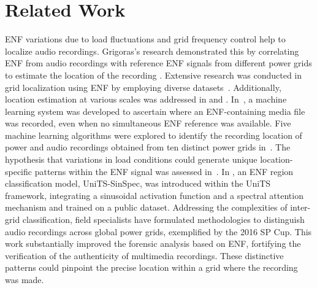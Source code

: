 \section{Related Work}
\label{sec:relatedWork}

ENF variations due to load fluctuations and grid frequency control help to localize audio recordings. Grigoras's research demonstrated this by correlating ENF from audio recordings with reference ENF signals from different power grids to estimate the location of the recording \cite{grigoras2005digital}. Extensive research was conducted in grid localization using ENF by employing diverse datasets~\cite{yao2017source}. Additionally, location estimation at various scales was addressed in \cite{sarkar2019application} and \cite{garg2021}. In~\cite{hajj2015}, a machine learning system was developed to ascertain where an ENF-containing media file was recorded, even when no simultaneous ENF reference was available. Five machine learning algorithms were explored to identify the recording location of power and audio recordings obtained from ten distinct power grids in~\cite{vsaric2016improving}. The hypothesis that variations in load conditions could generate unique location-specific patterns within the ENF signal was assessed in~\cite{garg2013geo}. In \cite{li2024advanced}, an ENF region classification model, UniTS-SinSpec, was introduced within the UniTS framework, integrating a sinusoidal activation function and a spectral attention mechanism and trained on a public dataset. Addressing the complexities of inter-grid classification, field specialists have formulated methodologies to distinguish audio recordings across global power grids, exemplified by the 2016 SP Cup. This work substantially improved the forensic analysis based on ENF, fortifying the verification of the authenticity of multimedia recordings. These distinctive patterns could pinpoint the precise location within a grid where the recording was made.